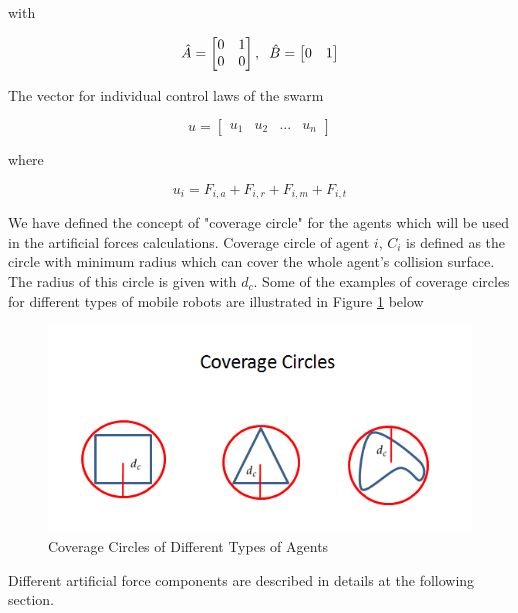 with

\begin{equation}
\hat{A} = \begin{bmatrix}
0&1\\0&0
\end{bmatrix} , \hspace{0.2cm} \hat{B} = \begin{bmatrix}
0&1
\end{bmatrix}
\end{equation}
			
The vector for individual control laws of the swarm

\begin{equation}
u = \begin{bmatrix}
u_1 & u_2 & ... & u_n
\end{bmatrix}
\end{equation}

where

\begin{equation}
u_i = F_{i,a} + F_{i,r} + F_{i,m} + F_{i,t}
\end{equation}

We have defined the concept of "coverage circle"	for the agents which will be used in the artificial forces calculations. Coverage circle of agent $i$, $C_i$ is defined as the circle with minimum radius which can cover the whole agent's collision surface. The radius of this circle is given with $d_c$. Some of the examples of coverage circles for different types of mobile robots are illustrated in Figure \ref{coverage_circle_ref} below
		
\begin{figure}[H]
\caption{Coverage Circles of Different Types of Agents} \label{coverage_circle_ref}
\centering
\includegraphics[scale = 0.60]{coverage_circles}
\end{figure}
		
Different artificial force components are described in details at the following section. \newline

